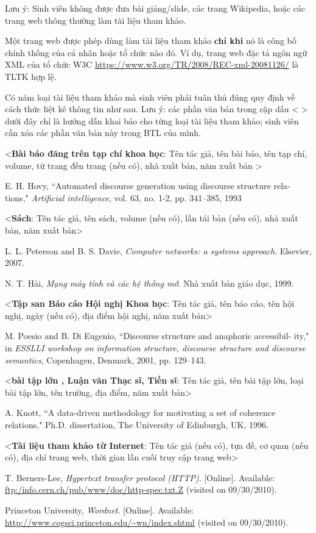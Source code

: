 \documentclass[../BTL.tex]{subfiles}
\begin{document}
Lưu ý: Sinh viên không được đưa bài giảng/slide, các trang Wikipedia, hoặc các trang web thông thường làm tài liệu tham khảo. 

Một trang web được phép dùng làm tài liệu tham khảo \textbf{chỉ khi} nó là công bố chính thống của cá nhân hoặc tổ chức nào đó. Ví dụ, trang web đặc tả ngôn ngữ XML của tổ chức W3C \url{https://www.w3.org/TR/2008/REC-xml-20081126/} là TLTK hợp lệ.

Có năm loại tài liệu tham khảo mà sinh viên phải tuân thủ đúng quy định về cách thức liệt kê thông tin như sau. Lưu ý: các phần văn bản trong cặp dấu < > dưới đây chỉ là hướng dẫn khai báo cho từng loại tài liệu tham khảo; sinh viên cần xóa các phần văn bản này trong BTL của mình.

<\textbf{Bài báo đăng trên tạp chí khoa học}: Tên tác giả, tên bài báo, tên tạp chí, volume, từ trang đến trang (nếu có), nhà xuất bản, năm xuất bản >



\cite{hovy1993automated} E. H. Hovy, ``Automated discourse generation using discourse structure rela-
tions," \textit{Artificial intelligence}, vol. 63, no. 1-2, pp. 341–385, 1993

<\textbf{Sách}: Tên tác giả, tên sách, volume (nếu có), lần tái bản (nếu có), nhà xuất bản, năm xuất bản>

\cite{peterson2007computer}	L. L. Peterson and B. S. Davie, \textit{Computer networks: a systems approach}. Elsevier, 2007.

\cite{NguyenThucHai}	N. T. Hải, \textit{Mạng máy tính và các hệ thống mở}. Nhà xuất bản giáo dục, 1999. 

<\textbf{Tập san Báo cáo Hội nghị Khoa học}: Tên tác giả, tên báo cáo, tên hội nghị, ngày (nếu có), địa điểm hội nghị, năm xuất bản>

\cite{poesio2001discourse}	M. Poesio and B. Di Eugenio, ``Discourse structure and anaphoric accessibil-
ity," in \textit{ESSLLI workshop on information structure, discourse structure and
discourse semantics}, Copenhagen, Denmark, 2001, pp. 129–143.

<\textbf{bài tập lớn , Luận văn Thạc sĩ, Tiến sĩ}: Tên tác giả, tên bài tập lớn, loại bài tập lớn, tên trường, địa điểm, năm xuất bản>

\cite{knott1996data}	A. Knott, ``A data-driven methodology for motivating a set of coherence relations," Ph.D. dissertation, The University of Edinburgh, UK, 1996.

<\textbf{Tài liệu tham khảo từ Internet}: Tên tác giả (nếu có), tựa đề, cơ quan (nếu có), địa chỉ trang web, thời gian lần cuối truy cập trang web>

\cite{BernersTim}	T. Berners-Lee, \textit{Hypertext transfer protocol (HTTP)}. [Online]. Available: \url{ftp:/info.cern.ch/pub/www/doc/http-spec.txt.Z} (visited on
09/30/2010).

\cite{LectureA} Princeton University, \textit{Wordnet}. [Online]. Available: \url{http://www.cogsci.princeton.edu/~wn/index.shtml} (visited on 09/30/2010).
\end{document}
